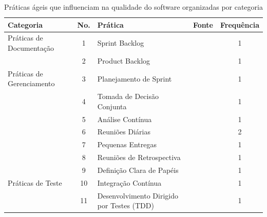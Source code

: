 \documentclass[sigconf]{acmart}
\begin{document}
\begin{table}[t]
\centering
\setcounter{table}{12}
\caption{Práticas ágeis que influenciam na qualidade do software organizadas por categoria}
\label{tab:praticas_ageis_ape}
\begin{tabular}{p{4cm} c p{5cm} p{3cm} c}
\toprule
\textbf{Categoria} & \textbf{No.} & \textbf{Prática} & \textbf{Fonte} & \textbf{Frequência} \\
\toprule
\multirow{1}{*}{Práticas de Documentação}
 & 1  & Sprint Backlog                                                  & \cite{Sivaram:2026} & 1 \\
 & 2  & Product Backlog                                                 & \cite{Sivaram:2026} & 1 \\
\multirow{1}{*}{Práticas de Gerenciamento}
 & 3  & Planejamento de Sprint                                          & \cite{Sivaram:2026} & 1 \\
 & 4  & Tomada de Decisão Conjunta                                      & \cite{Krancher:2020} & 1 \\
 & 5  & Análise Contínua                                                & \cite{Krancher:2020} & 1 \\
 & 6  & Reuniões Diárias                                                & \cite{Azhar:2023, Sivaram:2026} & 2 \\
 & 7  & Pequenas Entregas                                               & \cite{Azhar:2023} & 1 \\
 & 8  & Reuniões de Retrospectiva                                       & \cite{Sivaram:2026} & 1 \\
 & 9  & Definição Clara de Papéis                                       & \cite{Sivaram:2026} & 1 \\
\multirow{1}{*}{Práticas de Teste}
 & 10 & Integração Contínua                                             & \cite{Krancher:2020} & 1 \\
 & 11 & Desenvolvimento Dirigido por Testes (TDD)                       & \cite{Azhar:2023} & 1 \\
\bottomrule
\end{tabular}
\end{table}



\end{document}
